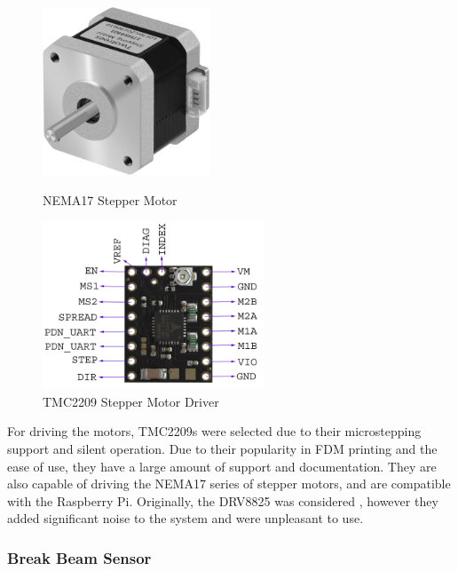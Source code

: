 \begin{figure}[H]
    \hfill
    \begin{minipage}[t]{0.45\textwidth}
      \centering
      \includegraphics[width=\textwidth,height=5cm, keepaspectratio]{imgs/parts/nema17.jpg}
      \caption{NEMA17 Stepper Motor \cite{nema17}}
    \end{minipage}
    \hfill
    \begin{minipage}[t]{0.45\textwidth}
        \centering
        \includegraphics[width=\textwidth,height=5cm, keepaspectratio]{imgs/parts/tmc2209.png}
        \caption{TMC2209 Stepper Motor Driver \cite{tmc2209}}
      \end{minipage}
      \hfill
\end{figure}

For driving the motors, TMC2209s were selected due to their microstepping support and silent operation. Due to their popularity in FDM printing and the ease of use, they have a large amount of support and documentation. They are also capable of driving the NEMA17 series of stepper motors, and are compatible with the Raspberry Pi. Originally, the DRV8825 was considered \cite{drv8825}, however they added significant noise to the system and were unpleasant to use.

\subsubsection{Break Beam Sensor}
\label{sec:break-beam-sensor}


